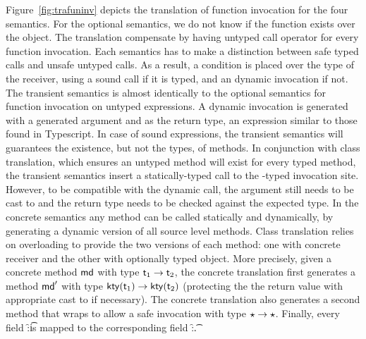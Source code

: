 \documentclass[runnningheads]{tex/llncs}
\begin{document}
Figure~\ref{fig:trafuninv} depicts the translation of function invocation
for the four semantics. For the optional semantics, we do not know if the
function exists over the object. The translation compensate by having
untyped call operator for every function invocation.  Each semantics has to
make a distinction between safe typed calls and unsafe untyped calls. As a
result, a condition is placed over the type of the receiver, using a sound
call if it is typed, and an dynamic invocation if not.  The transient
semantics is almost identically to the optional semantics for function
invocation on untyped expressions.  A dynamic invocation is generated with a
generated argument and \any as the return type, an expression similar to
those found in Typescript.  In case of sound expressions, the transient
semantics will guarantees the existence, but not the types, of methods. In
conjunction with class translation, which ensures an untyped method will
exist for every typed method, the transient semantics insert a
statically-typed call to the \any-typed invocation site. However, to be
compatible with the dynamic call, the argument still needs to be cast to
\any and the return type needs to be checked against the expected type.
In the concrete semantics any method can be called statically and
dynamically, by generating a dynamic version of all source level methods.
Class translation relies on overloading to provide the two versions of each
method: one with concrete receiver and the other with optionally typed
object.  More precisely, given a concrete method \(\md\) with type \(\t[1]
\to \t[2]\), the concrete translation first generates a method \(\mdp\) with
type \(\kty{\t[1]} \to \kty{\t[2]}\) (protecting the the return value with
appropriate cast to \kty{\t[2]} if necessary).  The concrete translation
also generates a second method \mdpp that wraps \mdp to allow a safe
invocation with type \(\star \to \star\).  Finally, every field \f:\t is
mapped to the corresponding field \f:\kty\t.
\end{document}
